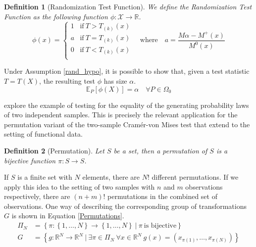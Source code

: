 \documentclass[12pt, a4paper]{article}
\theoremstyle{MAstyle} \newtheorem{assumption}{Assumption}[section]
\theoremstyle{MAstyle} \newtheorem{definition}{Definition}[section]
\begin{document}
			\begin{definition}[Randomization Test Function]\label{RandTestFunc}
				We define the Randomization Test Function as the following function $\phi: \mathcal{X} \rightarrow \mathbb{R}$.
					\begin{equation*}
						\phi(x) = \begin{cases}
							1 &\text{if} \ T > T_{(k)}(x) \\
							a &\text{if} \ T = T_{(k)}(x) \\
							0 &\text{if} \ T < T_{(k)}(x) \\
						\end{cases} \quad \text{where} \quad
						a = \frac{M\alpha - M^{+}(x)}{M^{0}(x)}
					\end{equation*}
				
			\end{definition}
			Under Assumption \ref{rand_hypo}, it is possible to show that, given a test statistic $T = T(X)$, the resulting test $\phi$ has size $\alpha$.
			\begin{equation}
				\mathbb{E}_{P}\left[\phi(X)\right] = \alpha \quad \forall P \in \Omega_0
			\end{equation}
			
		
			\cite{lehmann_testing_2005} explore the example of testing for the equality of the generating probability laws of two independent samples. This is precisely the relevant application for the permutation variant of the two-sample Cram\'{e}r-von Mises test that \cite{bugni_permutation_2021} extend to the setting of functional data. \\
			
			\begin{definition}[Permutation]
				Let $S$ be a set, then a permutation of $S$ is a bijective function $\pi: S \rightarrow S$.
			\end{definition}
			If $S$ is a finite set with $N$ elements, there are $N!$ different permutations. If we apply this idea to the setting of two samples with $n$ and $m$ observations respectively, there are $(n+m)!$ permutations in the combined set of observations. One way of describing the corresponding group of transformations $G$ is shown in Equation \ref{Permutations}.
			\begin{equation}\label{Permutations}
				\begin{split}
					\Pi_N &= \left\{\pi: \left\{1, \dots, N \right\} \rightarrow \left\{1, \dots, N \right\} \ \vert \ \pi \ \text{is bijective} \right\} \\
					G &= \left\{g:\mathbb{R}^N \rightarrow \mathbb{R}^N \ \vert \ \exists \pi \in \Pi_N \ \forall x \in \mathbb{R}^N \ g(x) = \left(x_{\pi(1)}, \dots, x_{\pi(N)}\right) \right\}
				\end{split}
			\end{equation}
			
\end{document}
